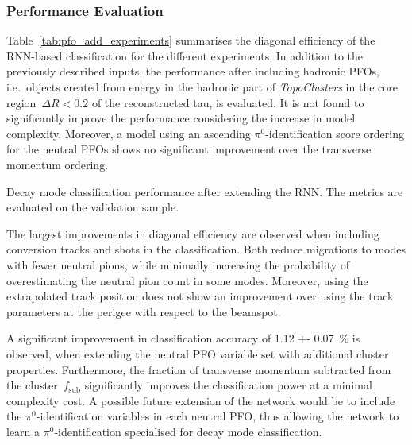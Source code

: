 \subsubsection{Performance Evaluation}

Table~\ref{tab:pfo_add_experiments} summarises the diagonal efficiency of the
RNN-based classification for the different experiments. In addition to the
previously described inputs, the performance after including hadronic PFOs,
i.e.\ objects created from energy in the hadronic part of \emph{TopoClusters} in
the core region~$\Delta R < 0.2$ of the reconstructed tau, is evaluated. It is
not found to significantly improve the performance considering the increase in
model complexity. Moreover, a model using an ascending $\pi^0$-identification
score ordering for the neutral PFOs shows no significant improvement over the
transverse momentum ordering.

\begin{table}[htb]
  \centering
  {\small}
  \caption{Decay mode classification performance after extending the RNN. The
    metrics are evaluated on the validation sample.}
  \label{tab:pfo_add_experiments}
\end{table}

The largest improvements in diagonal efficiency are observed when including
conversion tracks and shots in the classification. Both reduce migrations to
modes with fewer neutral pions, while minimally increasing the probability of
overestimating the neutral pion count in some modes. Moreover, using the
extrapolated track position does not show an improvement over using the track
parameters at the perigee with respect to the beamspot.

A significant improvement in classification accuracy of \SI{1.12 +-
  0.07}{\percent} is observed, when extending the neutral PFO variable set with
additional cluster properties. Furthermore, the fraction of transverse momentum
subtracted from the cluster~$f_\text{sub}$ significantly improves the
classification power at a minimal complexity cost. A possible future extension
of the network would be to include the $\pi^0$-identification variables in each
neutral PFO, thus allowing the network to learn a $\pi^0$-identification
specialised for decay mode classification.

